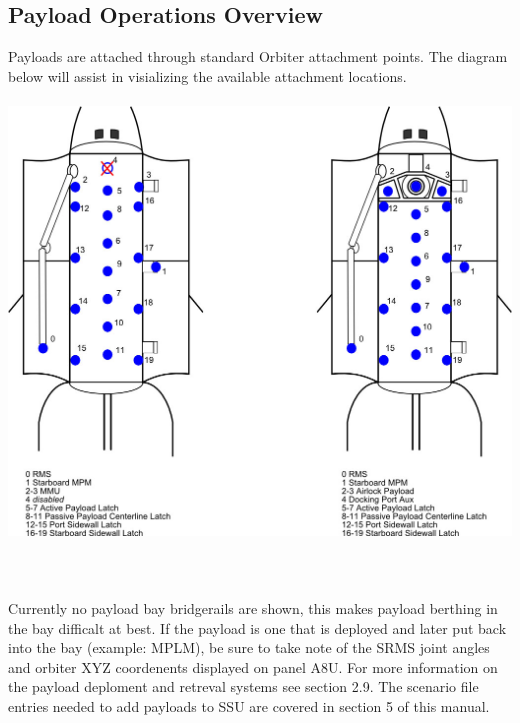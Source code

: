 \documentclass[13pt]{article}
\begin{document}
\subsection{\large Payload Operations Overview}
Payloads are attached through standard Orbiter attachment points. The diagram below will assist in visializing the available attachment locations.\\
\\
\includegraphics[width=1\textwidth]{SSU_Attachments.png}
\\
\\
\\
\\
Currently no payload bay bridgerails are shown, this makes payload berthing in the bay difficalt at best.  If the payload is one that is deployed and later put back into the bay (example: MPLM), be sure to take note of the SRMS joint angles and orbiter XYZ coordenents displayed on panel A8U. For more information on the payload deploment and retreval systems see section 2.9. The scenario file entries needed to add payloads to SSU are covered in section 5 of this manual. \\
\\
\newpage
\end{document}
